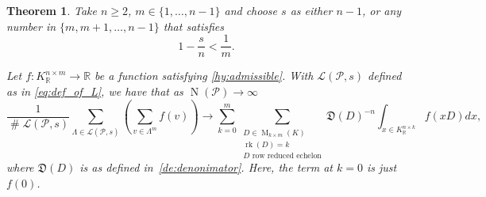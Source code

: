 \documentclass{amsart}
\newtheorem{theorem}{Theorem}
\theoremstyle{definition}
\theoremstyle{remark}
\DeclareMathOperator{\M}{M}
\DeclareMathOperator{\card}{\texttt{\#}}
\DeclareMathOperator{\rank}{rk}
\DeclareMathOperator{\N}{N}
\begin{document}
\begin{theorem}
    \label{th:higher_moments}
    Take $n \ge 2$, $m \in \{1,\dots,n-1\}$ and choose $s$ as either $n-1$, or any number in $\{m,m+1,\dots,n-1\}$ that satisfies
    \begin{equation}
        1-\frac{s}{n} < \frac{1}{m}.
    \end{equation}

    Let $f:K_{\mathbb{R}}^{n \times m} \rightarrow \mathbb{R}$ be a function satisfying \cref{hy:admissible}. 
    With $\mathcal{L}(\mathcal{P},s)$ defined as in \cref{eq:def_of_L}, 
    we have that as $\N(\mathcal{P}) \rightarrow \infty$
    {\small \begin{equation}
            \frac{1}{\card \mathcal{L}(\mathcal{P},s)} 
            \sum_{ \Lambda \in \mathcal{L}(\mathcal{P},s)} 
            \left( \sum_{v \in \Lambda^{m}} f(v)\right)
            \rightarrow
            \sum_{k=0}^{{m}}\sum_{\substack{D \in \M_{k \times m }(K) \\ 
                    \rank(D) = k \\ 
            D \text{ row reduced echelon}}}
            \mathfrak{D}(D)^{-n} \int_{x \in K_\mathbb{R}^{n \times k }} f(x D ) dx,
            \label{eq:right_side_converge}
    \end{equation}}
    where $\mathfrak{D}(D)$ is 
    as defined in~\cref{de:denonimator}. Here, the term at $k=0$ is just $f(0)$.
\end{theorem}
\end{document}
